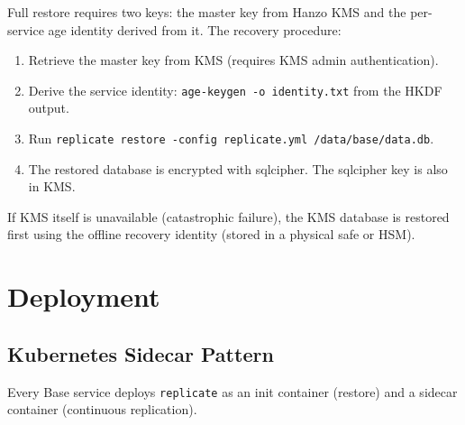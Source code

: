 \documentclass[11pt]{article}
\begin{document}
Full restore requires two keys: the master key from Hanzo KMS and the
per-service age identity derived from it. The recovery procedure:

\begin{enumerate}[nosep]
    \item Retrieve the master key from KMS (requires KMS admin
    authentication).
    \item Derive the service identity:
    \texttt{age-keygen -o identity.txt} from the HKDF output.
    \item Run \texttt{replicate restore -config replicate.yml
    /data/base/data.db}.
    \item The restored database is encrypted with sqlcipher. The sqlcipher key
    is also in KMS.
\end{enumerate}

If KMS itself is unavailable (catastrophic failure), the KMS database is
restored first using the offline recovery identity (stored in a physical
safe or HSM).

\section{Deployment}

\subsection{Kubernetes Sidecar Pattern}

Every Base service deploys \texttt{replicate} as an init container (restore)
and a sidecar container (continuous replication).
\end{document}
